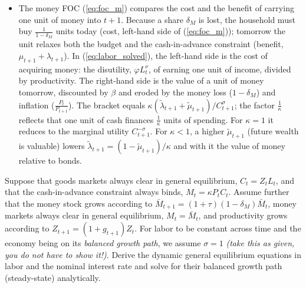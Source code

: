 \documentclass[a4paper, 12pt]{article}
\begin{document}
\begin{Answer}
\begin{itemize}
		\item[(\ref{eq:labor_solved})] The money FOC (\ref{eq:foc_m}) compares the cost and the benefit of carrying one unit of money into $t+1$. Because a share $\delta_M$ is lost, the household must buy $\frac{1}{1-\delta_M}$ units today (cost, left-hand side of (\ref{eq:foc_m})); tomorrow the unit relaxes both the budget and the cash-in-advance constraint (benefit, $\mu_{t+1}+\lambda_{t+1}$). In (\ref{eq:labor_solved}), the left-hand side is the cost of acquiring money: the disutility, $\varphi L_t^\nu$, of earning one unit of income, divided by productivity. The right-hand side is the value of a unit of money tomorrow, discounted by $\beta$ and eroded by the money loss ($1-\delta_M$) and inflation ($\frac{P_t}{P_{t+1}}$). The bracket equals $\kappa(\tilde\lambda_{t+1}+\tilde\mu_{t+1})/C_{t+1}^\sigma$; the factor $\frac{1}{\kappa}$ reflects that one unit of cash finances $\frac{1}{\kappa}$ units of spending. For $\kappa = 1$ it reduces to the marginal utility $C_{t+1}^{-\sigma}$. For $\kappa<1$, a higher $\tilde\mu_{t+1}$ (future wealth is valuable) lowers $\tilde\lambda_{t+1} = (1-\tilde\mu_{t+1})/\kappa$ and with it the value of money relative to bonds.%
	\end{itemize}%
\end{Answer}%
\bigskip%
\begin{Exercise}[title={General equilibrium and balanced growth path},label=ex_3]%
	Suppose that goods markets always clear in general equilibrium, $C_t = Z_t L_t$, and that the cash-in-advance constraint always binds, $M_t = \kappa P_t C_t$. Assume further that the money stock grows according to $\bar{M}_{t+1} = (1+\tau) \left(1-\delta_M\right) \bar{M}_t$, money markets always clear in general equilibrium, $M_t=\bar{M}_t$, and productivity grows according to $Z_{t+1} = (1+g_{t+1}) Z_t$. For labor to be constant across time and the economy being on its \emph{balanced growth path}, we assume $\sigma = 1$ \emph{(take this as given, you do not have to show it!)}. Derive the dynamic general equilibrium equations in labor and the nominal interest rate and solve for their balanced growth path (steady-state) analytically.%
\end{Exercise}%
\bigskip%
\end{document}
